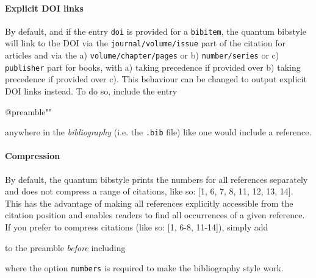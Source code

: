 \documentclass[a4paper,twocolumn,11pt]{quantumarticle}
\begin{document}
\paragraph{Explicit DOI links}
By default, and if the entry \texttt{doi} is provided for a \texttt{bibitem}, the quantum bibstyle will link to the DOI via the \texttt{journal/volume/issue} part of the citation for articles and via the a) \texttt{volume/chapter/pages} or b) \texttt{number/series} or c) \texttt{publisher} part for books, with a) taking precedence if provided over b) taking precedence if provided over c).
This behaviour can be changed to output explicit DOI links instead. To do so, include the entry
\begin{verbatim*}
@preamble{"\MakeDoiLinksExplicit"}
\end{verbatim*}
anywhere in the \emph{bibliography} (i.e. the \texttt{.bib} file) like one would include a reference.

\paragraph{Compression}
By default, the quantum bibstyle prints the numbers for all references separately and does not compress
a range of citations, like so: [1, 6, 7, 8, 11, 12, 13, 14].
This has the advantage of making all references explicitly accessible from the citation position and enables readers to find all occurrences of a given reference.
If you prefer to compress citations (like so: [1, 6-8, 11-14]), simply add
\begin{verbatim*}
\end{verbatim*}
to the preamble \emph{before} including
\begin{verbatim*}
\usepackage[numbers]{natbib}
\end{verbatim*}
where the option \texttt{numbers} is required to make the bibliography style work.
\end{document}

